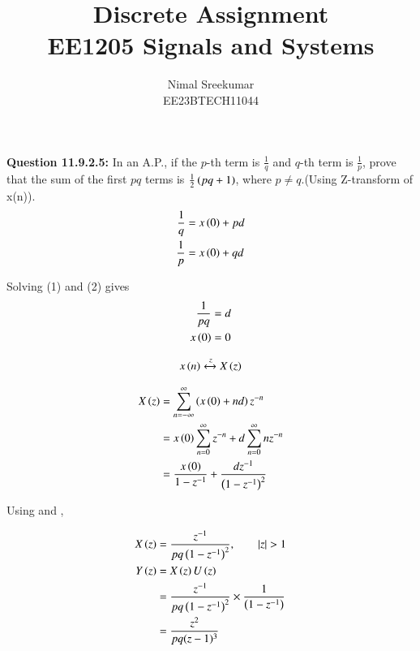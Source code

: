 \documentclass[a4,12pt,twocolumn]{IEEEtran}
\begin{document}
\let\vec\mathbf

\title{
\Huge\textbf{Discrete Assignment}\\
\Huge\textbf{EE1205} Signals and Systems\\
}
\large\author{Nimal Sreekumar\\EE23BTECH11044}

\maketitle



\bigskip

\renewcommand{\thefigure}{\theenumi}
\renewcommand{\thetable}{\theenumi}


\textbf{Question 11.9.2.5:}
In an A.P., if the \(p\)-th term is \(\frac{1}{q}\) and \(q\)-th term is \(\frac{1}{p}\), prove that the sum of the first \(pq\) terms is \(\frac{1}{2}\left(pq + 1\right)\), where \(p \neq q\).(Using Z-transform of x(n)).\\

\solution
\begin{align}
    \frac{1}{q} &= x\left(0\right) + pd \\
    \frac{1}{p} &= x\left(0\right) + qd
\end{align}

Solving (1) and (2) gives
\begin{align}
    \frac{1}{pq} &= d\\
    x\left(0\right) &= 0
\end{align}

\begin{align}
x\left(n\right) \xleftrightarrow z  X\left(z\right)
\end{align}

\begin{align}
X\left(z\right) &=\sum_{n=-\infty}^{\infty} \left(x\left(0\right) + nd\right) z^{-n}\\
&= x\left(0\right) \sum_{n=0}^{\infty} z^{-n} + d \sum_{n=0}^{\infty}nz^{-n}\\
&= \frac{x\left(0\right)}{1-z^{-1}} + \frac{dz^{-1}}{\left(1-z^{-1}\right)^2}  
\end{align}

Using  and ,

\begin{align}
X\left(z\right) &= \frac{z^{-1}}{pq\left(1-z^{-1}\right)^2} , \qquad |z| > 1\\
Y\left(z\right) &= X\left(z\right)U\left(z\right) \\
&= \frac{z^{-1}}{pq\left(1-z^{-1}\right)^2} \times \frac{1}{\left(1-z^{-1}\right)}\\
&= \frac{z^2}{pq(z-1)^3}
\end{align}
\end{document}

